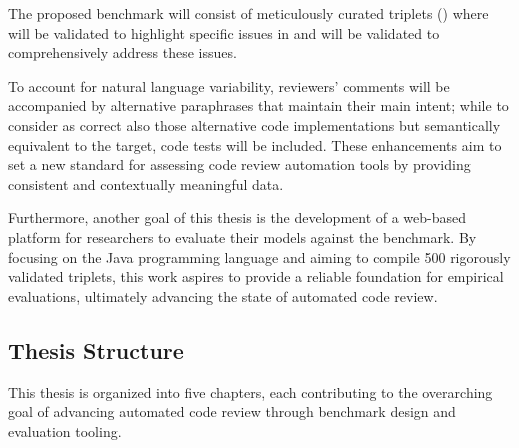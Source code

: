 The proposed benchmark will consist of meticulously curated triplets (\subCode)
where \revComment will be validated to highlight specific issues in \subCode and
\revCode will be validated to comprehensively address these issues.

To account for natural language variability, reviewers' comments will be accompanied by
alternative paraphrases that maintain their main intent; while to consider as correct also
those alternative code implementations but semantically equivalent to the target, code tests will
be included. These enhancements aim to set a new standard for assessing code review
automation tools by providing consistent and contextually meaningful data.

Furthermore, another goal of this thesis is the development of a web-based platform for researchers to
evaluate their models against the benchmark. By focusing on the Java
programming language and aiming to compile 500 rigorously validated triplets,
this work aspires to provide a reliable foundation for empirical evaluations,
ultimately advancing the state of automated code review.

\subsection{Thesis Structure}

This thesis is organized into five chapters, each contributing to the overarching goal of advancing
automated code review through benchmark design and evaluation tooling.

